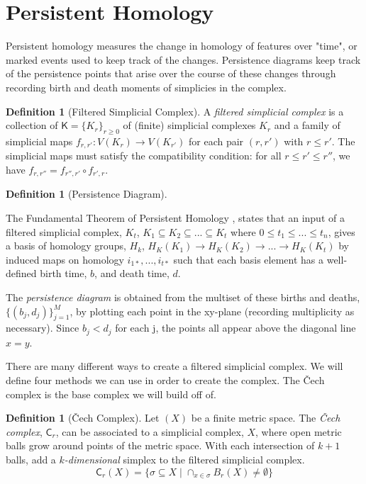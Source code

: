 \documentclass[ma]{uncgdissertationexp}
\theoremstyle{plain}
\theoremstyle{definition}
\newtheorem{definition}[theorem]{Definition}
\theoremstyle{remark}
\begin{document}
\section{Persistent Homology}
\par Persistent homology measures the change in homology of features over "time", or marked events used to keep track of the changes. Persistence diagrams keep track of the persistence points that arise over the course of these changes through recording birth and death moments of simplicies in the complex.

\begin{definition}[Filtered Simplicial Complex]
\par A \textit{filtered simplicial complex} is a collection of $\mathsf{K}=\{K_{r}\}_{r\geq 0}$ of (finite) simplicial complexes $K_{r}$ and a family of simplicial maps $f_{r, r'}: V(K_{r})\rightarrow V(K_{r'})$ for each pair $(r, r')$ with $r \leq r'$. The simplicial maps must satisfy the compatibility condition: for all $r\leq r'\leq r''$, we have $f_{r, r''} = f_{r'', r'} \circ {f_{r', r}}$.
\end{definition}

\begin{definition}[Persistence Diagram]
\label{def:persdia}
\par The Fundamental Theorem of Persistent Homology \cite{computpershom}, states that an input of a filtered simplicial complex, $K_t$,  $K_{1} \subseteq K_{2} \subseteq ... \subseteq K_{t}$ where $0\leq t_{1} \leq ... \leq t_{n} $, gives a basis of homology groups, $H_{k}$, $H_{K}(K_{1}) \rightarrow H_{K}(K_{2}) \rightarrow ...\rightarrow H_{K}(K_{t})$ by induced maps on homology $i_{1*}, ..., i_{t*}$ such that each basis element has a well-defined birth time, $b$, and death time, $d$.
\par The \textit{persistence diagram} is obtained from the multiset of these births and deaths, $\{(b_{j},d_{j})\}^{M}_{j=1}$, by plotting each point in the xy-plane (recording multiplicity as necessary). Since $b_{j} < d_{j}$ for each j, the points all appear above the diagonal line $x=y$.
\end{definition}

\par There are many different ways to create a filtered simplicial complex. We will define four methods we can use in order to create the complex. The Čech complex is the base complex we will build off of.

\begin{definition}[Čech Complex]
Let $(X)$ be a finite metric space. The \textit{Čech complex}, $\mathsf{C}_r$, can be associated to a simplicial complex, $X$, where open metric balls grow around points of the metric space. With each intersection of $k+1$ balls, add a $k$\textit{-dimensional} simplex to the filtered simplicial complex.\\
$$\mathsf{C}_{r}(X) = \{\sigma \subseteq X \mid \cap_{x \in \sigma} B_{r}(X) \not= \emptyset\}$$
\end{definition}
\end{document}
